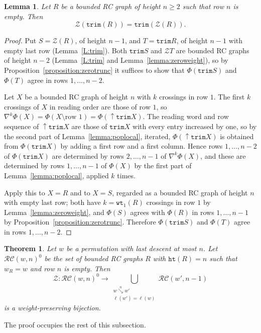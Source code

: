 \documentclass{amsart}
\newtheorem{lemma}{Lemma}[subsection]
\newtheorem{theorem}{Theorem}[section]
\theoremstyle{definition}
\theoremstyle{remark}
\numberwithin{equation}{subsection}
\newcommand{\downvar}[1]{\stackrel{#1}{\searrow}}
\newcommand{\wof}[1]{w_{#1}}
\newcommand{\wtt}{\mathtt{wt}}
\newcommand{\trm}{\mathtt{trim}}
\newcommand{\zeromap}{\mathcal{Z}}
\newcommand{\hr}{\mathtt{ht}}
\begin{document}
\begin{lemma} \label{lemma:ztrim}
Let $R$ be a bounded RC graph of height $n\geq 2$ such that row $n$ is empty. Then
$$\zeromap(\trm(R)) = \trm(\zeromap(R))\text{.}$$
\end{lemma}
\begin{proof}
Put $S=\zeromap(R)$, of height $n-1$, and $T=\trm R$, of height $n-1$ with empty last row (Lemma~\ref{L:trim}). Both $\trm S$ and $\zeromap T$ are bounded RC graphs of height $n-2$ (Lemma~\ref{L:trim} and Lemma~\ref{lemma:zeroweight}), so by Proposition~\ref{proposition:zerotrunc} it suffices to show that $\Phi(\trm S)$ and $\Phi(T)$ agree in rows $1,\ldots,n-2$.

Let $X$ be a bounded RC graph of height $n$ with $k$ crossings in row $1$. The first $k$ crossings of $X$ in reading order are those of row $1$, so $\nabla^k\Phi(X)=\Phi(X\setminus\text{row }1)=\Phi({\uparrow}\trm X)$. The reading word and row sequence of ${\uparrow}\trm X$ are those of $\trm X$ with every entry increased by one, so by the second part of Lemma~\ref{lemma:poplocal}, iterated, $\Phi({\uparrow}\trm X)$ is obtained from $\Phi(\trm X)$ by adding a first row and a first column. Hence rows $1,\ldots,n-2$ of $\Phi(\trm X)$ are determined by rows $2,\ldots,n-1$ of $\nabla^k\Phi(X)$, and these are determined by rows $1,\ldots,n-1$ of $\Phi(X)$ by the first part of Lemma~\ref{lemma:poplocal}, applied $k$ times.

Apply this to $X=R$ and to $X=S$, regarded as a bounded RC graph of height $n$ with empty last row; both have $k=\wtt_1(R)$ crossings in row $1$ by Lemma~\ref{lemma:zeroweight}, and $\Phi(S)$ agrees with $\Phi(R)$ in rows $1,\ldots,n-1$ by Proposition~\ref{proposition:zerotrunc}. Therefore $\Phi(\trm S)$ and $\Phi(T)$ agree in rows $1,\ldots,n-2$.
\end{proof}

\begin{theorem} \label{theorem:zero_bijection}
Let $w$ be a permutation with last descent at most $n$. Let $\mathcal{RC}(w,n)^0$ be the set of bounded RC graphs $R$ with $\hr(R)=n$ such that $\wof{R}=w$ and row $n$ is empty. Then
$$\zeromap:\mathcal{RC}(w, n)^{0}\to \bigcup_{\substack{w\downvar{n} w'\\\ell(w')=\ell(w)}}\mathcal{RC}(w', n-1)$$
is a weight-preserving bijection.
\end{theorem}

The proof occupies the rest of this subsection.
\end{document}
